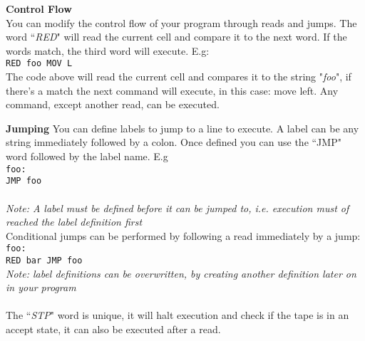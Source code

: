 \documentclass{article}
\begin{document}
    {\bf Control Flow}\\
    You can modify the control flow of your program through reads and jumps.
    The word ``{\it RED}" will read the current cell and compare it to the next word.
    If the words match, the third word will execute.
    E.g:\\
    \indent \texttt{RED foo MOV L}\\

    The code above will read the current cell  and compares it to the string "{\it foo}", if there's a match the next command will execute, in this case: move left.
    Any command, except another read, can be executed.

    {\bf Jumping}
    You can define labels to jump to a line to execute. A label can be any string immediately followed by a colon. Once defined you can use the ``JMP" word followed by the label name.
    E.g\\
    \indent \texttt{foo:\\\indent JMP foo}\\~\\
    {\it Note: A label must be defined before it can be jumped to, i.e. execution must of reached the label definition first}\\

    Conditional jumps can be performed by following a read immediately by a jump:\\
    \indent \texttt{foo:\\\indent RED bar JMP foo}\\


    {\it Note: label definitions can be overwritten, by creating another definition later on in your program}\\~\\

    The ``{\it STP}" word is unique, it will halt execution and check if the tape 
    is in an accept state, it can also be executed after a read.
\end{document}
